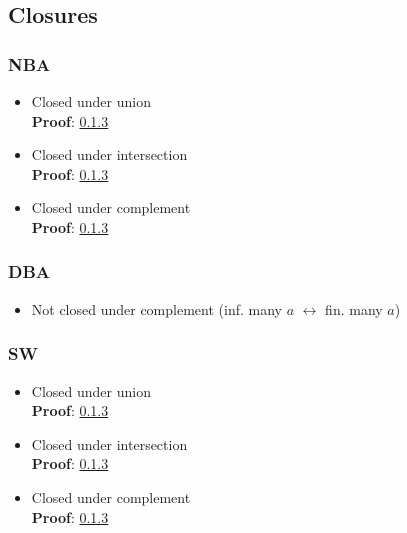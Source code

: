 \documentclass{article}
\begin{document}
\subsection{Closures}
\subsubsection{NBA}
\begin{itemize}
	\item Closed under union \\
    	\textbf{Proof}: \ref{} %
    \item Closed under intersection \\
    	\textbf{Proof}: \ref{} %
    \item Closed under complement \\
    	\textbf{Proof}: \ref{} %
\end{itemize}

\subsubsection{DBA}
\begin{itemize}
	\item Not closed under complement (inf. many $a$ $\leftrightarrow$ fin. many $a$)
\end{itemize}

\subsubsection{SW}
\begin{itemize}
	\item Closed under union \\
    	\textbf{Proof}: \ref{} %
    \item Closed under intersection \\
    	\textbf{Proof}: \ref{} %
    \item Closed under complement \\
    	\textbf{Proof}: \ref{} %
\end{itemize}
\end{document}
